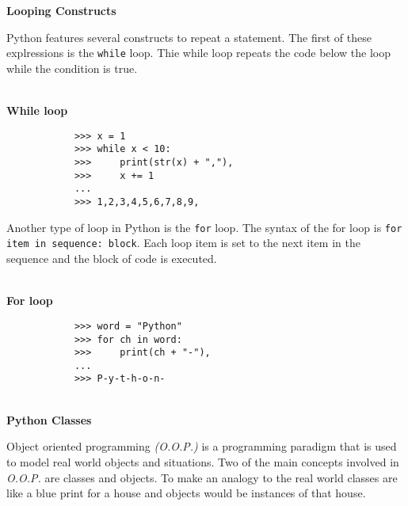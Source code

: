 \documentclass[letterpaper,11pt]{article}
\begin{document}
\\ \\
\clearpage
\textbf{Looping Constructs}
\par{Python features several constructs to repeat a statement. The first of
these explressions is the \texttt{while} loop. Thie while loop repeats the code
below the loop while the condition is true.}
\\ \\
\begin{minipage}{.5\textwidth}
    \small \textbf{While loop}
    \begin{tcolorbox}
        \begin{footnotesize}
            \begin{verbatim}
            >>> x = 1
            >>> while x < 10:
            >>>     print(str(x) + ","),
            >>>     x += 1
            ...
            >>> 1,2,3,4,5,6,7,8,9,
            \end{verbatim}
        \end{footnotesize}
    \end{tcolorbox}
\end{minipage}
\par{Another type of loop in Python is the \texttt{for} loop. The syntax of the
for loop is \texttt{for item in sequence: block}. Each loop item is set to the
next item in the sequence and the block of code is executed.}
\\ \\
\begin{minipage}{.5\textwidth}
    \small \textbf{For loop}
    \begin{tcolorbox}
        \begin{footnotesize}
            \begin{verbatim}
            >>> word = "Python"
            >>> for ch in word:
            >>>     print(ch + "-"),
            ...
            >>> P-y-t-h-o-n-
            \end{verbatim}
        \end{footnotesize}
    \end{tcolorbox}
\end{minipage}
\\
\textbf{Python Classes}
\par{Object oriented programming \textit{(O.O.P.)} is a programming paradigm that is used to
    model real world objects and situations. Two of the main concepts involved
in \textit{O.O.P.} are classes and objects. To make an analogy to the real
world classes are like a blue print for a house and objects would be instances
of that house.}
\end{document}
